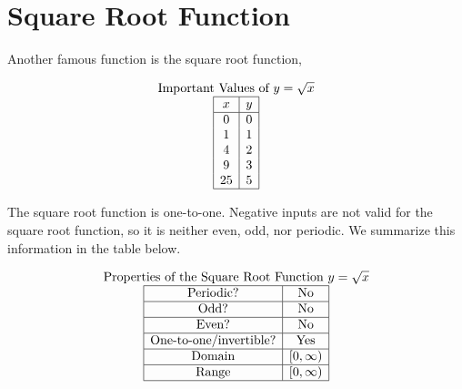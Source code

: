 \documentclass[nooutcomes]{ximera}
\begin{document}
\newpage


\section{Square Root Function}
Another famous function is the square root function,

\begin{center}
\end{center}

\begin{center}
\end{center}


\[
\begin{array}{c }
 \text{\normalfont Important Values of $y=\sqrt{x}$} \\
\begin{array}{|c|c|}
 \hline
 x & y\\
 \hline
 0&0\\
 1&1\\
 4&2\\
 9&3\\
 25&5\\
 \hline
\end{array}
\end{array}
\]

The square root function is one-to-one. Negative inputs are not valid for the square root function, so it is neither even, odd, nor periodic. We summarize this information in the table below.

\[
\begin{array}{c }
 \text{\normalfont Properties of the Square Root Function } y=\sqrt{x} \\
\begin{array}{|c|c|}
 \hline
\text{Periodic?} & \text{No} \\ \hline
\text{Odd?} & \text{No} \\ \hline
\text{Even?} & \text{No} \\ \hline
\text{One-to-one/invertible?} & \text{Yes}\\ \hline
\text{Domain} & [0,\infty)\\ \hline
\text{Range} & [0,\infty)\\ \hline
\end{array}
\end{array}
\]
\end{document}
